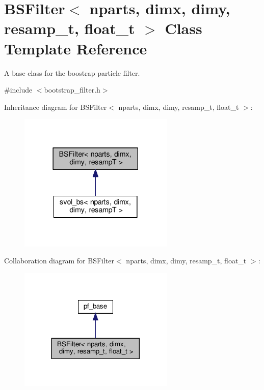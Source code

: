 \hypertarget{classBSFilter}{}\section{B\+S\+Filter$<$ nparts, dimx, dimy, resamp\+\_\+t, float\+\_\+t $>$ Class Template Reference}
\label{classBSFilter}


A base class for the boostrap particle filter.  




{\ttfamily \#include $<$bootstrap\+\_\+filter.\+h$>$}



Inheritance diagram for B\+S\+Filter$<$ nparts, dimx, dimy, resamp\+\_\+t, float\+\_\+t $>$\+:
\nopagebreak
\begin{figure}[H]
\begin{center}
\leavevmode
\includegraphics[width=209pt]{classBSFilter__inherit__graph}
\end{center}
\end{figure}


Collaboration diagram for B\+S\+Filter$<$ nparts, dimx, dimy, resamp\+\_\+t, float\+\_\+t $>$\+:
\nopagebreak
\begin{figure}[H]
\begin{center}
\leavevmode
\includegraphics[width=209pt]{classBSFilter__coll__graph}
\end{center}
\end{figure}
